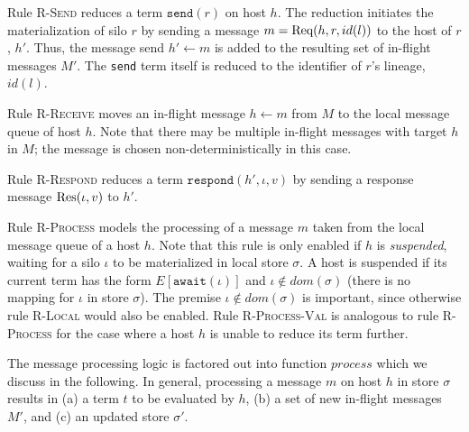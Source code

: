 Rule \textsc{R-Send} reduces a term $\texttt{send}(r)$ on host
$h$. The reduction initiates the materialization of silo $r$ by
sending a message $m = {\textrm{Req}(h, r, id(l))}$ to the host of $r$,
$h'$. Thus, the message send $h' \leftarrow m$ is added to the
resulting set of in-flight messages $M'$. The \verb|send| term itself
is reduced to the identifier of $r$'s lineage, $id(l)$.

Rule \textsc{R-Receive} moves an in-flight message $h \leftarrow m$
from $M$ to the local message queue of host $h$. Note that there may
be multiple in-flight messages with target $h$ in $M$; the message is
chosen non-deterministically in this case.

Rule \textsc{R-Respond} reduces a term $\texttt{respond}(h', \iota,
v)$ by sending a response message ${\textrm{Res}(\iota, v)}$ to $h'$.

Rule \textsc{R-Process} models the processing of a message $m$ taken
from the local message queue of a host $h$. Note that this rule is
only enabled if $h$ is {\it suspended}, waiting for a silo $\iota$ to
be materialized in local store $\sigma$. A host is suspended if its
current term has the form $E[\texttt{await}(\iota)]$ and $\iota \notin
dom(\sigma)$ (there is no mapping for $\iota$ in store $\sigma$).  The
premise $\iota \notin dom(\sigma)$ is important, since otherwise rule
\textsc{R-Local} would also be enabled. Rule \textsc{R-Process-Val} is
analogous to rule \textsc{R-Process} for the case where a host $h$ is
unable to reduce its term further.

The message processing logic is factored out into function
$\mathit{process}$ which we discuss in the following. In general,
processing a message $m$ on host $h$ in store $\sigma$ results in (a)
a term $t$ to be evaluated by $h$, (b) a set of new in-flight messages
$M'$, and (c) an updated store $\sigma'$.


%
%

